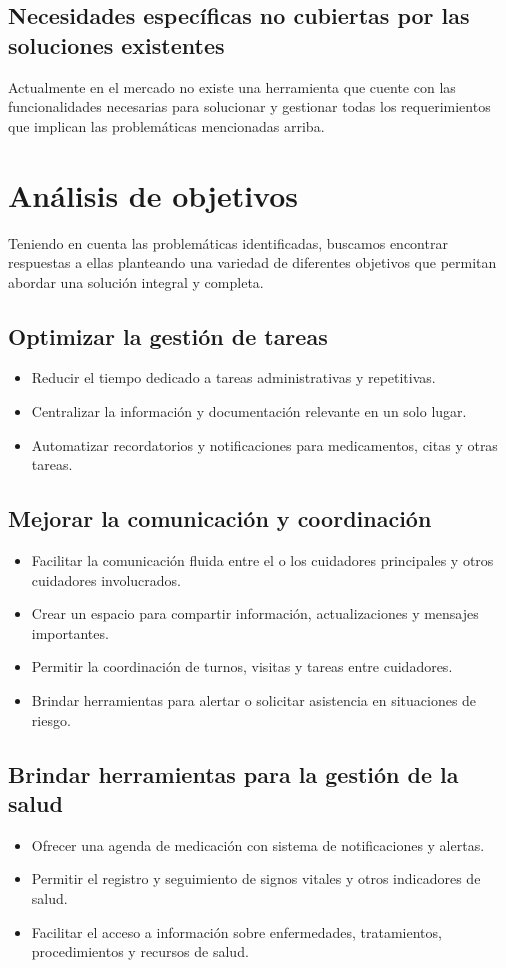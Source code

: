 \documentclass[a4paper,12pt]{article}
\begin{document}
    \subsection{Necesidades específicas no cubiertas por las soluciones existentes}
    Actualmente en el mercado no existe una herramienta que cuente con las funcionalidades necesarias para solucionar y gestionar todas los requerimientos que implican las problemáticas mencionadas arriba. 

    \section{Análisis de objetivos}
    Teniendo en cuenta las problemáticas identificadas, buscamos encontrar respuestas a ellas planteando una variedad de diferentes objetivos que permitan abordar una solución integral y completa.
    \subsection{Optimizar la gestión de tareas}
    \begin{itemize}
        \item Reducir el tiempo dedicado a tareas administrativas y repetitivas.
        \item Centralizar la información y documentación relevante en un solo lugar.
        \item Automatizar recordatorios y notificaciones para medicamentos, citas y otras tareas.
    \end{itemize}
    \subsection{Mejorar la comunicación y coordinación}
    \begin{itemize}
        \item Facilitar la comunicación fluida entre el o los cuidadores principales y otros cuidadores involucrados.
        \item Crear un espacio para compartir información, actualizaciones y mensajes importantes.
        \item Permitir la coordinación de turnos, visitas y tareas entre cuidadores.
        \item Brindar herramientas para alertar o solicitar asistencia en situaciones de riesgo.
    \end{itemize}
    \subsection{Brindar herramientas para la gestión de la salud}
    \begin{itemize}
        \item Ofrecer una agenda de medicación con sistema de notificaciones y alertas.
        \item Permitir el registro y seguimiento de signos vitales y otros indicadores de salud.
        \item Facilitar el acceso a información sobre enfermedades, tratamientos, procedimientos y recursos de salud.
    \end{itemize}
\end{document}
